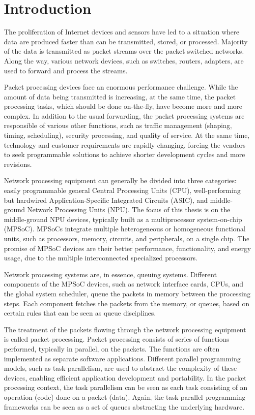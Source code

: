 \chapter{Introduction}
\label{chapter:intro}
The proliferation of Internet devices and sensors have led to a situation where data are produced faster than can be transmitted, stored, or processed. Majority of the data is transmitted as packet streams over the packet switched networks. Along the way, various network devices, such as switches, routers, adapters, are used to forward and process the streams.

Packet processing devices face an enormous performance challenge. While the amount of data being transmitted is increasing, at the same time, the packet processing tasks, which should be done on-the-fly, have become more and more complex. In addition to the usual forwarding, the packet processing systems are responsible of various other functions, such as traffic management (shaping, timing, scheduling), security processing, and quality of service. At the same time, technology and customer requirements are rapidly changing, forcing the vendors to seek programmable solutions to achieve shorter development cycles and more revisions.

Network processing equipment can generally be divided into three categories: easily programmable general Central Processing Units (CPU), well-performing but hardwired Application-Specific Integrated Circuits (ASIC), and middle-ground Network Processing Units (NPU). The focus of this thesis is on the middle-ground NPU devices, typically built as a multiprocessor system-on-chip (MPSoC). MPSoCs integrate multiple heterogeneous or homogeneous functional units, such as processors, memory, circuits, and peripherals, on a single chip. The promise of MPSoC devices are their better performance,  functionality, and energy usage, due to the multiple interconnected specialized processors.

Network processing systems are, in essence, queuing systems. Different components of the MPSoC devices, such as network interface cards, CPUs, and the global system scheduler, queue the packets in memory between the processing steps. Each component fetches the packets from the memory, or queues, based on certain rules that can be seen as queue disciplines.

The treatment of the packets flowing through the network processing equipment is called packet processing. Packet processing consists of series of functions performed, typically in parallel, on the packets. The functions are often implemented as separate software applications. Different parallel programming models, such as task-parallelism, are used to abstract the complexity of these devices, enabling efficient application development and portability. In the packet processing context, the task parallelism can be seen as each task consisting of an operation (code) done on a packet (data). Again, the task parallel programming frameworks can be seen as a set of queues abstracting the underlying hardware.

